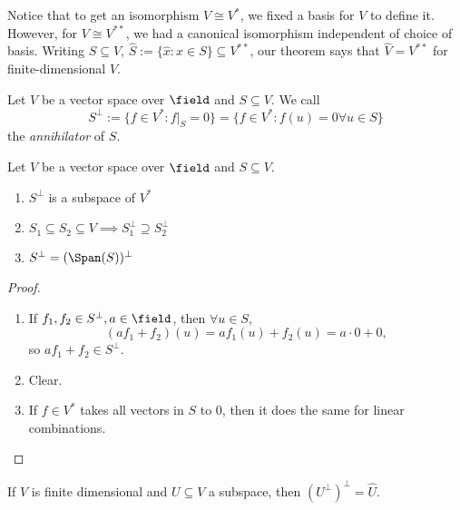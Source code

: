 \begin{remark}
Notice that to get an isomorphism $V \cong V^\ast$, we fixed a basis for $V$ to define it. However, for $V \cong V^{\ast\ast}$, we had a canonical isomorphism independent of choice of basis. Writing $S \subseteq V$, $\hat S := \{\hat{x} : x \in S\} \subseteq V^{\ast\ast}$, our theorem says that $\hat{V} = V^{\ast \ast}$ for finite-dimensional $V$.
\end{remark}

\begin{definition}[Annihilator]
    Let $V$ be a vector space over $\field$ and $S \subseteq V$. We call \[
    S^\perp := \{f \in V^\ast : f\vert_S = 0\}  = \{
        f \in V^\ast : f(u) = 0 \forall u \in S
    \}
    \]
    the \emph{annihilator} of $S$.
\end{definition}

\begin{proposition}
    Let $V$ be a vector space over $\field$ and $S \subseteq V$.
    \begin{enumerate}
        \item $S^\perp$ is a subspace of $V^\ast$\footnotemark
        \item $S_1 \subseteq S_2 \subseteq V \implies S_1^\perp \supseteq S_2^\perp$
        \item $S^\perp = (\Span(S))^\perp$
    \end{enumerate}
\end{proposition}
\begin{proof}
    \begin{enumerate}
        \item If $f_1, f_2 \in S^\perp, a \in \field$, then $\forall u \in S$, \[
        (af_1 +f_2)(u) = af_1(u) + f_2(u) = a\cdot 0 + 0,    
        \]
        so $af_1 + f_2 \in S^\perp$.
        \item Clear.
        \item If $f \in V^\ast$ takes all vectors in $S$ to $0$, then it does the same for linear combinations.
    \end{enumerate}
\end{proof}

\begin{proposition}
    If $V$ is finite dimensional and $U \subseteq V$ a subspace, then $(U^\perp)^\perp = \hat{U}$.
\end{proposition}

